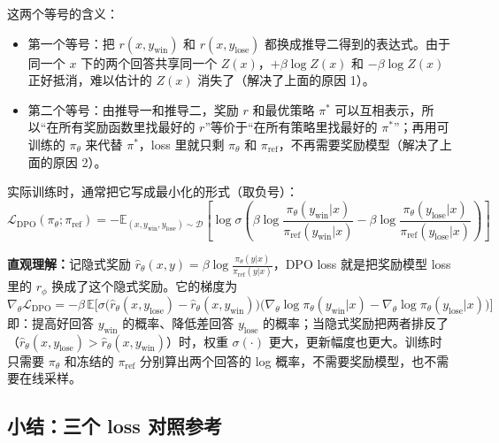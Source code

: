 \documentclass[UTF8,fontset=fandol]{ctexart}
\begin{document}
这两个等号的含义：
\begin{itemize}
\item 第一个等号：把 \(r(x, y_{\text{win}})\) 和 \(r(x, y_{\text{lose}})\) 都换成推导二得到的表达式。由于同一个 \(x\) 下的两个回答共享同一个 \(Z(x)\)，\(+\beta \log Z(x)\) 和 \(-\beta \log Z(x)\) 正好抵消，难以估计的 \(Z(x)\) 消失了（解决了上面的原因 1）。
\item 第二个等号：由推导一和推导二，奖励 \(r\) 和最优策略 \(\pi^*\) 可以互相表示，所以“在所有奖励函数里找最好的 \(r\)”等价于“在所有策略里找最好的 \(\pi^*\)”；再用可训练的 \(\pi_\theta\) 来代替 \(\pi^*\)，loss 里就只剩 \(\pi_\theta\) 和 \(\pi_{\text{ref}}\)，不再需要奖励模型（解决了上面的原因 2）。
\end{itemize}

实际训练时，通常把它写成最小化的形式（取负号）：
\[
\boxed{\mathcal{L}_{\text{DPO}}(\pi_\theta; \pi_{\text{ref}}) = -\mathbb{E}_{(x, y_{\text{win}}, y_{\text{lose}}) \sim \mathcal{D}} \left[ \log \sigma \left( \beta \log \frac{\pi_\theta(y_{\text{win}}|x)}{\pi_{\text{ref}}(y_{\text{win}}|x)} - \beta \log \frac{\pi_\theta(y_{\text{lose}}|x)}{\pi_{\text{ref}}(y_{\text{lose}}|x)} \right) \right]}
\]

\textbf{直观理解：}记隐式奖励 \(\hat{r}_\theta(x, y) = \beta \log \frac{\pi_\theta(y|x)}{\pi_{\text{ref}}(y|x)}\)，DPO loss 就是把奖励模型 loss 里的 \(r_\phi\) 换成了这个隐式奖励。它的梯度为
\[
\nabla_\theta \mathcal{L}_{\text{DPO}} = -\beta\, \mathbb{E}\Big[ \sigma\big(\hat{r}_\theta(x, y_{\text{lose}}) - \hat{r}_\theta(x, y_{\text{win}})\big) \big( \nabla_\theta \log \pi_\theta(y_{\text{win}}|x) - \nabla_\theta \log \pi_\theta(y_{\text{lose}}|x) \big) \Big]
\]
即：提高好回答 \(y_{\text{win}}\) 的概率、降低差回答 \(y_{\text{lose}}\) 的概率；当隐式奖励把两者排反了（\(\hat{r}_\theta(x, y_{\text{lose}}) > \hat{r}_\theta(x, y_{\text{win}})\)）时，权重 \(\sigma(\cdot)\) 更大，更新幅度也更大。训练时只需要 \(\pi_\theta\) 和冻结的 \(\pi_{\text{ref}}\) 分别算出两个回答的 log 概率，不需要奖励模型，也不需要在线采样。

\subsection{小结：三个 loss 对照参考}
\end{document}
